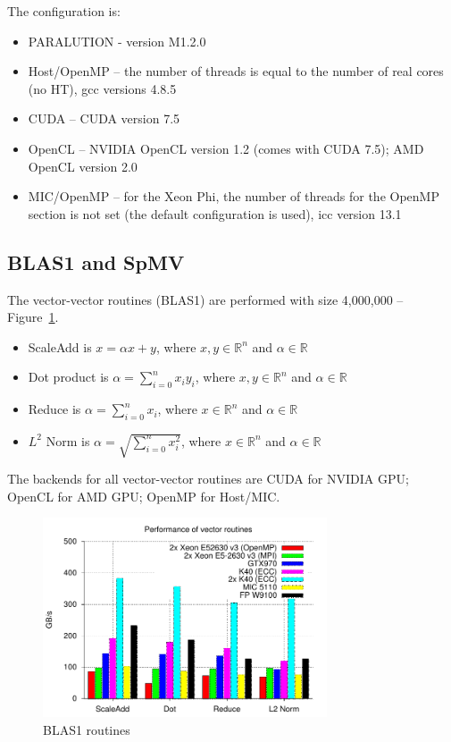 The configuration is:
\begin{itemize}
  \item PARALUTION - version M1.2.0
 \item Host/OpenMP -- the number of threads is equal to the number of real cores (no HT), gcc versions 4.8.5
 \item CUDA -- CUDA version 7.5
 \item OpenCL -- NVIDIA OpenCL version 1.2 (comes with CUDA 7.5); AMD OpenCL version 2.0
 \item MIC/OpenMP -- for the Xeon Phi, the number of threads for the OpenMP section is not set (the default configuration is used), icc version 13.1
\end{itemize}


\subsection{BLAS1 and SpMV}

The vector-vector routines (BLAS1) are performed with size 4,000,000 -- Figure~\ref{perf-BLAS1}.

\begin{itemize}
    \item ScaleAdd is $x = \alpha x + y$, where $x,y \in \mathbb{R}^n$ and $\alpha \in \mathbb{R}$
    \item Dot product is $\alpha = \sum_{i=0}^{n} x_i y_i$, where $x,y \in \mathbb{R}^n$ and $\alpha \in \mathbb{R}$
    \item Reduce is $\alpha = \sum_{i=0}^n x_i$, where $x \in \mathbb{R}^n$ and $\alpha \in \mathbb{R}$
    \item $L^2$ Norm is $\alpha = \sqrt{\sum_{i=0}^n x_i^2}$, where $x \in \mathbb{R}^n$ and $\alpha \in \mathbb{R}$
  \end{itemize}

The backends for all vector-vector routines are CUDA for NVIDIA GPU; OpenCL for AMD GPU; OpenMP for Host/MIC.

\begin{figure}[h!]
\centering
\includegraphics[width=0.75\textwidth]{./fig/perf/BLAS1.pdf}
\caption{BLAS1 routines}
\label{perf-BLAS1}
\end{figure}

